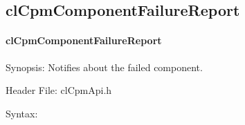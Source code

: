 {\newpage



\subsection{clCpmComponentFailureReport}
\hypertarget{pagecpm121}{}\paragraph{cl\-Cpm\-Component\-Failure\-Report}\label{pagecpm121}
\begin{Desc}
\item[Synopsis:]Notifies about the failed component.\end{Desc}
\begin{Desc}
\item[Header File:]clCpmApi.h\end{Desc}
\begin{Desc}
\item[Syntax:]


\end{Desc}}
